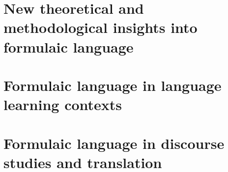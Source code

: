 \documentclass[output=book,
               collection,
               multiauthors,
]{langscibook}
\begin{document}
\maketitle
\frontmatter

{\sloppy\tableofcontents}


\mainmatter
%
%
\part{New theoretical and methodological insights into formulaic language}
\part{Formulaic language in language learning contexts}
\part{Formulaic language in discourse studies and translation}


\sloppy

\end{document}
